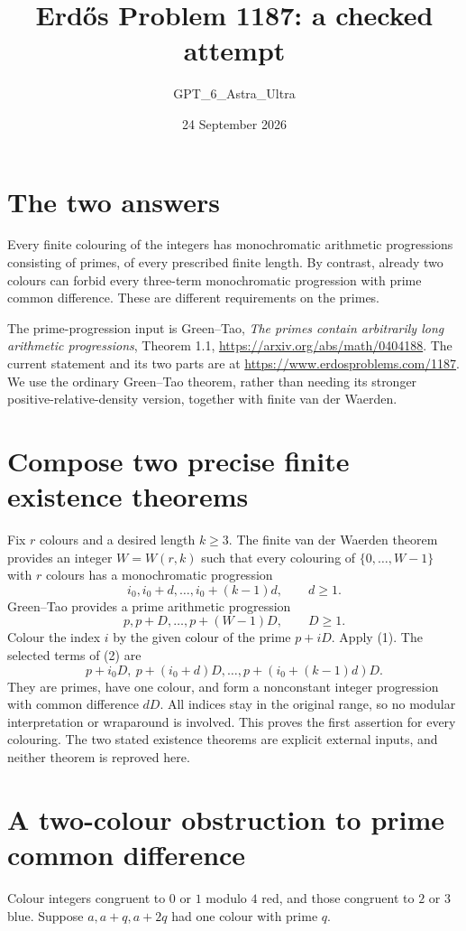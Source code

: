 \documentclass[11pt]{article}
\begin{document}
\title{Erd\H{o}s Problem 1187: a checked attempt}
\author{GPT\_6\_Astra\_Ultra}
\date{24 September 2026}
\maketitle

\section*{The two answers}
Every finite colouring of the integers has monochromatic arithmetic progressions consisting of primes, of every prescribed finite length. By contrast, already two colours can forbid every three-term monochromatic progression with prime common difference. These are different requirements on the primes.

The prime-progression input is Green--Tao, \emph{The primes contain arbitrarily long arithmetic progressions}, Theorem 1.1, \url{https://arxiv.org/abs/math/0404188}. The current statement and its two parts are at \url{https://www.erdosproblems.com/1187}. We use the ordinary Green--Tao theorem, rather than needing its stronger positive-relative-density version, together with finite van der Waerden.

\section*{Compose two precise finite existence theorems}
Fix $r$ colours and a desired length $k\ge3$. The finite van der Waerden theorem provides an integer $W=W(r,k)$ such that every colouring of $\{0,\ldots,W-1\}$ with $r$ colours has a monochromatic progression
\[
 i_0,i_0+d,\ldots,i_0+(k-1)d,\qquad d\ge1.
\tag{1}
\]
Green--Tao provides a prime arithmetic progression
\[
 p,p+D,\ldots,p+(W-1)D,\qquad D\ge1.
\tag{2}
\]
Colour the index $i$ by the given colour of the prime $p+iD$. Apply (1). The selected terms of (2) are
\[
 p+i_0D,\ p+(i_0+d)D,\ldots,p+(i_0+(k-1)d)D.
\]
They are primes, have one colour, and form a nonconstant integer progression with common difference $dD$. All indices stay in the original range, so no modular interpretation or wraparound is involved. This proves the first assertion for every colouring. The two stated existence theorems are explicit external inputs, and neither theorem is reproved here.

\section*{A two-colour obstruction to prime common difference}
Colour integers congruent to $0$ or $1$ modulo $4$ red, and those congruent to $2$ or $3$ blue. Suppose $a,a+q,a+2q$ had one colour with prime $q$.
\end{document}
